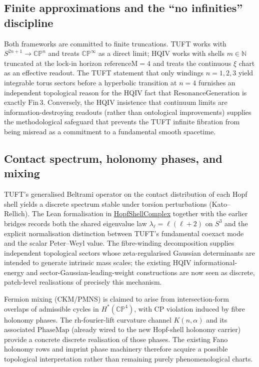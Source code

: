 \documentclass[11pt]{article}
\begin{document}
\subsection{Finite approximations and the ``no infinities'' discipline}

Both frameworks are committed to finite truncations. TUFT works with
$S^{2n+1}\to\mathbb{CP}^n$ and treats $\mathbb{CP}^\infty$ as a direct
limit; HQIV works with shells $m\in\mathbb{N}$ truncated at the lock-in
horizon $\mathrm{referenceM}=4$ and treats the continuous $\xi$ chart as
an effective readout. The TUFT statement that only windings $n=1,2,3$
yield integrable torus sectors before a hyperbolic transition at $n=4$
furnishes an independent topological reason for the HQIV fact that
$\mathrm{ResonanceGeneration}$ is exactly $\mathrm{Fin}\,3$. Conversely,
the HQIV insistence that continuum limits are information-destroying
readouts (rather than ontological improvements) supplies the
methodological safeguard that prevents the TUFT infinite fibration from
being misread as a commitment to a fundamental smooth spacetime.

\subsection{Contact spectrum, holonomy phases, and mixing}

TUFT's generalised Beltrami operator on the contact distribution of each
Hopf shell yields a discrete spectrum stable under torsion perturbations
(Kato--Rellich). The Lean formalisation in
\hyperref[lean:hopf-shell-complex]{HopfShellComplex} together with the
earlier bridges records both the shared eigenvalue law
$\lambda_\ell=\ell(\ell+2)$ on $S^3$ and the explicit normalisation
distinction between TUFT's fundamental coexact mode and the scalar
Peter--Weyl value. The fibre-winding decomposition supplies independent
topological sectors whose zeta-regularised Gaussian determinants are
intended to generate intrinsic mass scales; the existing HQIV
informational-energy and sector-Gaussian-leading-weight constructions
are now seen as discrete, patch-level realisations of precisely this
mechanism.

Fermion mixing (CKM/PMNS) is claimed to arise from intersection-form
overlaps of admissible cycles in $H^*(\mathbb{CP}^4)$, with CP violation
induced by fibre holonomy phases. The rh-fourier-lift curvature channel
$K(n,\alpha)$ and its associated $\mathrm{PhaseMap}$ (already wired to
the new Hopf-shell holonomy carrier) provide a concrete discrete
realisation of those phases. The existing Fano holonomy rows and
imprint phase machinery therefore acquire a possible topological
interpretation rather than remaining purely phenomenological charts.
\end{document}
